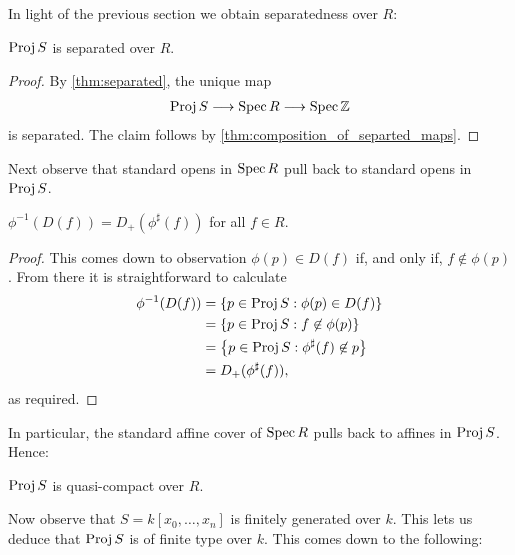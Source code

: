 \documentclass{article}
\begin{document}
In light of the previous section we obtain separatedness
over $R$:

\begin{corollary}
  $\operatorname{Proj} S$ is separated over $R$.
  \begin{proof}
    By \ref{thm:separated}, the unique map
    \begin{align*}
      \operatorname{Proj} S \longrightarrow \operatorname{Spec} R \longrightarrow \operatorname{Spec}\mathbb{Z}
    \end{align*}
    is separated. The claim follows by \ref{thm:composition_of_separted_maps}.
  \end{proof}
\end{corollary}

Next observe that standard opens in $\operatorname{Spec} R$ pull back to
standard opens in $\operatorname{Proj} S$.

\begin{lemma}
  ${\phi}^{-1}(D(f))=D_+(\phi^\sharp(f))$ for all $f\in R$.
  \begin{proof}
    This comes down to observation $\phi(p)\in D(f)$
    if, and only if, $f\not\in\phi(p)$. From there it is
    straightforward to calculate
    \begin{align*}
      {\phi}^{-1}(D(f))
      &= \left\lbrace{p\in\operatorname{Proj}S : \phi(p) \in D(f)}\right\rbrace \\
      &= \left\lbrace{p\in\operatorname{Proj}S : f\not\in\phi(p)}\right\rbrace \\
      &= \left\lbrace{p\in\operatorname{Proj}S : \phi^\sharp(f)\not\in p}\right\rbrace \\
      &= D_+(\phi^\sharp(f)),
    \end{align*}
    as required.
  \end{proof}
\end{lemma}

In particular, the standard affine cover of $\operatorname{Spec} R$ pulls back to
affines in $\operatorname{Proj} S$. Hence:

\begin{corollary}\label{thm:quasi_compact}
  $\operatorname{Proj} S$ is quasi-compact over $R$.
\end{corollary}

Now observe that $S=k[x_0,\ldots,x_n]$ is finitely generated over
$k$. This lets us deduce that $\operatorname{Proj} S$ is of finite type over $k$.
This comes down to the following:
\end{document}
